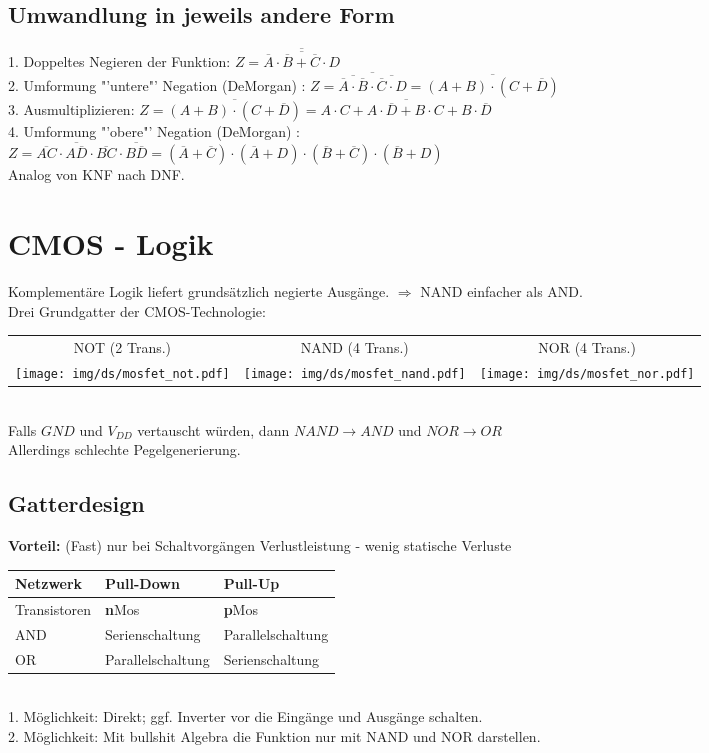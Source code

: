 \documentclass[6pt,a4paper]{scrartcl}
\renewcommand{\emph}[1]{\textsf{\textbf{#1}}}
\newcommand{\ol}[1]{\ensuremath{\overline{#1}}}									%
\newcommand{\ra}[0]{\ensuremath{\rightarrow}} 									%
\begin{document}
\begin{multicols}{3}
\subsection{Umwandlung in jeweils andere Form}
1. Doppeltes Negieren der Funktion: $ Z = \overline {\overline{\overline A \cdot \overline B + \overline C \cdot D}}$\\
2. Umformung "'untere"'  Negation (DeMorgan) : $ Z = \ol{\ol{\ol A \cdot \ol B} \cdot \ol{\ol C \cdot D}} = \ol{(A+B) \cdot (C+\ol D)}$\\
3. Ausmultiplizieren: $ Z = \ol{(A+B) \cdot (C+\ol D)} = \ol{A\cdot C + A\cdot \ol D + B \cdot C + B \cdot \ol D}$\\
4. Umformung "'obere"'  Negation (DeMorgan) :\\ $ Z= \ol{AC} \cdot \ol{A \ol D} \cdot \ol{BC} \cdot \ol{B\ol D} = ( \ol A + \ol C) \cdot ( \ol A + D) \cdot ( \ol B + \ol C) \cdot ( \ol B + D)$\\
Analog von KNF nach DNF.
\section{CMOS - Logik}
Komplementäre Logik liefert grundsätzlich negierte Ausgänge. $\Rightarrow$ NAND einfacher als AND.\\
Drei Grundgatter der CMOS-Technologie:\\
	\begin{tabular}{ccc}
		NOT (2 Trans.) & NAND (4 Trans.) & NOR (4 Trans.)\\
		\texttt{[image: img/ds/mosfet\_not.pdf]} \quad & \texttt{[image: img/ds/mosfet\_nand.pdf]} \quad & \texttt{[image: img/ds/mosfet\_nor.pdf]} \\
	\end{tabular}\\
	Falls $GND$ und $V_{DD}$ vertauscht würden, dann $NAND \ra AND$ und $NOR \ra OR$\\
	Allerdings schlechte Pegelgenerierung.
	
	\subsection{Gatterdesign}
	\emph{Vorteil:}	 (Fast) nur bei Schaltvorgängen Verlustleistung - wenig statische Verluste
	\begin{tabular}{l|l|l}
		Netzwerk & Pull-Dow\bf{n} & Pull-U\bf{p} \\ \midrule
		Transistoren & \textbf{n}Mos & \textbf{p}Mos \\
		AND & Serienschaltung	 & Parallelschaltung \\
		OR & Parallelschaltung & Serienschaltung \\
	\end{tabular}\\
	1. Möglichkeit: Direkt; ggf. Inverter vor die Eingänge und Ausgänge schalten.\\
	2. Möglichkeit: Mit bullshit Algebra die Funktion nur mit NAND und NOR darstellen.\\


\end{multicols}
\end{document}
